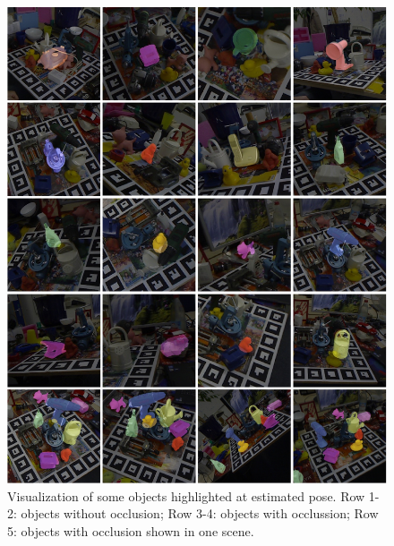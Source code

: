 \documentclass[12pt,DIV14,BCOR12mm,a4paper,footinclude=false,headinclude,parskip=half-,twoside,openright,cleardoublepage=empty,toc=index,bibliography=totoc,listof=totoc]{scrreprt}
\numberwithin{equation}{chapter}
\begin{document}
\begin{figure}[H]
	\centering
	\includegraphics[width=1.\textwidth]{img/vis_all.pdf}
	\caption{Visualization of some objects highlighted at estimated pose. Row 1-2: objects without occlusion; Row 3-4: objects with occlussion; Row 5: objects with occlusion shown in one scene.}
	\label{img:vis_all}
\end{figure}
\end{document}
